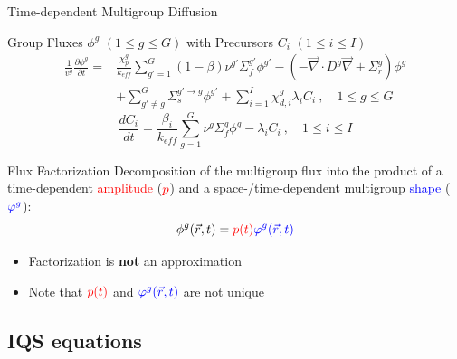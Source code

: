 \documentclass[8pt]{beamer}
\renewcommand{\div}{\vec{\nabla}\! \cdot \!}
\newcommand{\grad}{\vec{\nabla}}
\newcommand{\be}{\begin{equation*}}
\newcommand{\ee}{\end{equation*}}
\newcommand{\keff}{\ensuremath{k_{\textit{eff}}}}
\newcommand{\tcr}[1]{\textcolor{red}{#1}}
\newcommand{\tcb}[1]{\textcolor{blue}{#1}}
\begin{document}
\begin{frame}{Time-dependent Multigroup Diffusion}


\begin{block}{Group Fluxes $\phi^g$ $(1 \le g \le G )$ with Precursors $C_i$ $(1 \le i \le I)$}
\begin{align*}
\frac{1}{v^g} \frac{\partial \phi^g }{\partial t} =& \frac{\chi_p^g}{\keff} \sum_{g'=1}^G (1-\beta) \nu^{g'} \Sigma_f^{g'} \phi^{g'} -  \left( -\div D^g \grad  + \Sigma_r^g \right) \phi^g  \nonumber \\
&  + \sum_{g'\neq g}^G\Sigma_s^{g'\to g} \phi^{g'}  + \sum_{i=1}^I\chi_{d,i}^g\lambda_i C_i \ , \quad 1 \le g \le G 
\end{align*}
\be
\frac{dC_i}{dt} = \frac{\beta_i}{k_{eff}}\sum_{g=1}^G\nu^{g} \Sigma_f^g \phi^{g} - \lambda_i C_i \ , \quad 1 \le i \le I 
\ee
\end{block}


\begin{block}{Flux Factorization}
Decomposition of the multigroup flux into the product of a time-dependent \tcr{amplitude} ($\tcr{p}$) and a space-/time-dependent multigroup \tcb{shape} ($\tcb{\varphi^g}$):
\begin{equation*}
\phi^g(\vec{r},t) = \tcr{p(t)} \tcb{\varphi^g(\vec{r},t)}
\end{equation*}

\begin{itemize}
\item 
Factorization is \textbf{not} an approximation
\item
Note that $\tcr{p(t)}$ and $\tcb{\varphi^g(\vec{r},t)}$ are not unique 
\end{itemize}
\end{block}

\end{frame}


\subsection{IQS equations}
\end{document}
